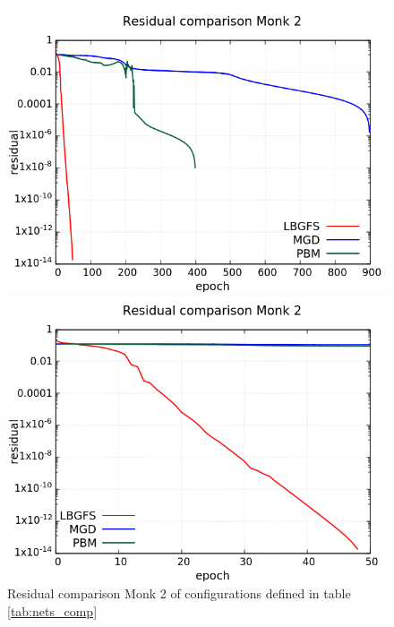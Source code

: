 \begin{figure}[H]
	\centering
	\begin{minipage}[t]{0.5\linewidth}
		\includegraphics[width=\linewidth]{data/Comparison/Monk2/Monk2_R_Comparison_log_standard.png}
	\end{minipage}%
	\begin{minipage}[t]{0.5\linewidth}
		\includegraphics[width=\linewidth]{data/Comparison/Monk2/Monk2_R_Comparison_log_zoom.png}
	\end{minipage}
	\caption{Residual comparison Monk 2 of configurations defined in table \ref{tab:nets_comp}}
	\label{R-Monk2}
\end{figure}
